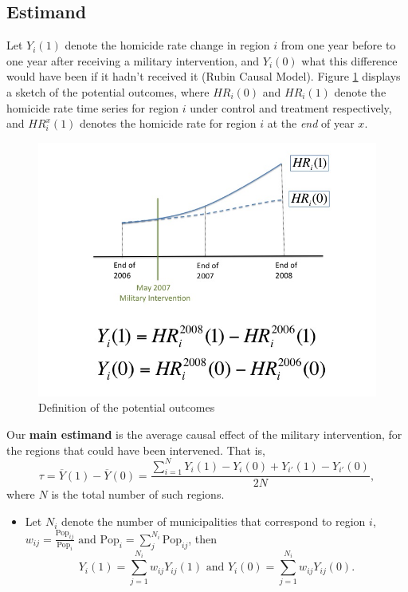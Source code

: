 \documentclass{article}[11 pt]
\begin{document}
\subsection{Estimand}
		        Let $Y_i(1)$ denote the homicide rate change in region $i$ from one year before to one year after receiving a military intervention, and $Y_i(0)$ what this difference would have been if it hadn't received it (Rubin Causal Model). Figure \ref{responseDef} displays a sketch of the potential outcomes, where $HR_i(0)$ and $HR_i(1)$ denote the homicide rate time series for region $i$ under control and treatment respectively, and $HR_i^{x}(1)$ denotes the homicide rate for region $i$ at the \emph{end} of year $x$.
		
		
				\begin{figure}[htdp]
					\centering
				      \includegraphics[scale=0.3]{Images/ResponseDef/Slide1.jpg}
				      \caption{Definition of the potential outcomes}
				\label{responseDef}
				\end{figure}
		  		Our \textbf{ main estimand} is the average causal effect of the military intervention, for the regions that could have been intervened. That is, $$\tau=\overline{Y}(1)-\overline{Y}(0)=\frac{ \sum_{i=1}^{N} Y_i(1)-Y_i(0)+ Y_{i'}(1)-Y_{i'}(0)}{2N},$$ where $N$ is the total number of such regions.
				\begin{itemize}
					   \item Let $N_i$ denote the number of municipalities that correspond to region $i$, $w_{ij}= \frac{\textrm{Pop}_{ij}}{\textrm{Pop}_{i}} \textrm{ and  }\textrm{Pop}_{i}= \sum_j^{N_i}\textrm{Pop}_{ij}$, then 
						$$Y_i(1) = \sum_{j=1}^{N_i}w_{ij}Y_{ij}(1) \textrm{ and } Y_i(0) = \sum_{j=1}^{N_i}w_{ij}Y_{ij}(0).$$						
				\end{itemize}
\end{document}
